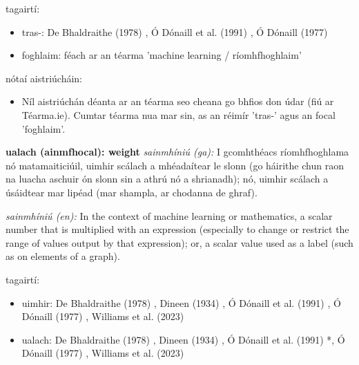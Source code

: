 \documentclass{article}
\begin{document}
tagairtí:
\begin{itemize}
	\item tras-: De Bhaldraithe (1978) \cite{de-bhaldraithe}, Ó Dónaill et al. (1991) \cite{focloir-beag}, Ó Dónaill (1977) \cite{odonaill}
	\item foghlaim: féach ar an téarma 'machine learning / ríomhfhoghlaim'
\end{itemize}

nótaí aistriúcháin:
\begin{itemize}
	\item Níl aistriúchán déanta ar an téarma seo cheana go bhfios don údar (fiú ar Téarma.ie). Cumtar téarma nua mar sin, as an réimír 'tras-' agus an focal 'foghlaim'.
\end{itemize}


\textbf{ualach (ainmfhocal): weight}
\textit{sainmhíniú (ga):} I gcomhthéacs ríomhfhoghlama nó matamaiticiúil, uimhir scálach a mhéadaítear le slonn (go háirithe chun raon na luacha aschuir ón slonn sin a athrú nó a shrianadh); nó, uimhir scálach a úsáidtear mar lipéad (mar shampla, ar chodanna de ghraf).

\textit{sainmhíniú (en):} In the context of machine learning or mathematics, a scalar number that is multiplied with an expression (especially to change or restrict the range of values output by that expression); or, a scalar value used as a label (such as on elements of a graph).

tagairtí:
\begin{itemize}
	\item uimhir: De Bhaldraithe (1978) \cite{de-bhaldraithe}, Dineen (1934) \cite{dineen}, Ó Dónaill et al. (1991) \cite{focloir-beag}, Ó Dónaill (1977) \cite{odonaill}, Williams et al. (2023) \cite{storchiste}
	\item ualach: De Bhaldraithe (1978) \cite{de-bhaldraithe}, Dineen (1934) \cite{dineen}, Ó Dónaill et al. (1991) \cite{focloir-beag}*, Ó Dónaill (1977) \cite{odonaill}, Williams et al. (2023) \cite{storchiste}
\end{itemize}
\end{document}
